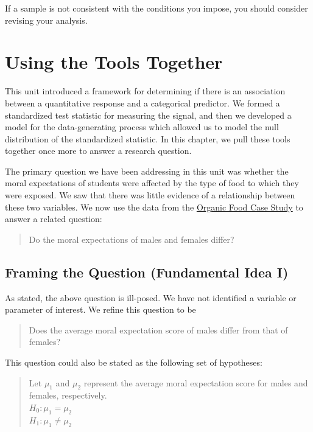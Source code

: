 \documentclass[]{book}
\theoremstyle{definition}
\theoremstyle{definition}
\theoremstyle{definition}
\theoremstyle{remark}
\begin{document}
If a sample is not consistent with the conditions you impose, you should
consider revising your analysis.

\chapter{Using the Tools Together}\label{ANOVArecap}

This unit introduced a framework for determining if there is an
association between a quantitative response and a categorical predictor.
We formed a standardized test statistic for measuring the signal, and
then we developed a model for the data-generating process which allowed
us to model the null distribution of the standardized statistic. In this
chapter, we pull these tools together once more to answer a research
question.

The primary question we have been addressing in this unit was whether
the moral expectations of students were affected by the type of food to
which they were exposed. We saw that there was little evidence of a
relationship between these two variables. We now use the data from the
\protect\hyperlink{CaseOrganic}{Organic Food Case Study} to answer a
related question:

\begin{quote}
Do the moral expectations of males and females differ?
\end{quote}

\section{Framing the Question (Fundamental Idea
I)}\label{framing-the-question-fundamental-idea-i-1}

As stated, the above question is ill-posed. We have not identified a
variable or parameter of interest. We refine this question to be

\begin{quote}
Does the average moral expectation score of males differ from that of
females?
\end{quote}

This question could also be stated as the following set of hypotheses:

\begin{quote}
Let \(\mu_1\) and \(\mu_2\) represent the average moral expectation
score for males and females, respectively.\\
\(H_0: \mu_1 = \mu_2\)\\
\(H_1: \mu_1 \neq \mu_2\)
\end{quote}
\end{document}
